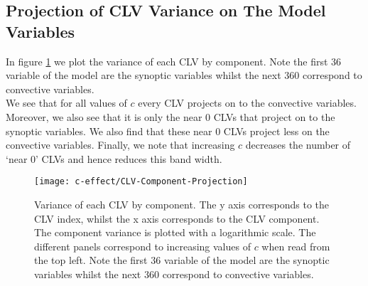 \subsection{Projection of CLV Variance on The Model Variables}

In figure \ref{fig:c-effect-projection} we plot the variance of each CLV by component. Note the first $36$ variable of the model are the synoptic variables whilst the next $360$ correspond to convective variables.\\

We see that for all values of $c$ every CLV projects on to the convective variables. Moreover, we also see that it is only the near $0$ CLVs that project on to the synoptic variables. We also find that these near $0$ CLVs project less on the convective variables. Finally, we note that increasing $c$ decreases the number of `near $0$' CLVs and hence reduces this band width.

\begin{figure}
\centering
\texttt{[image: c-effect/CLV-Component-Projection]}
\caption{Variance of each CLV by component. The y axis corresponds to the CLV index, whilst the x axis corresponds to the CLV component. The component variance is plotted with a logarithmic scale. The different panels correspond to increasing values of $c$ when read from the top left. Note the first $36$ variable of the model are the synoptic variables whilst the next $360$ correspond to convective variables.}
\label{fig:c-effect-projection}
\end{figure}
